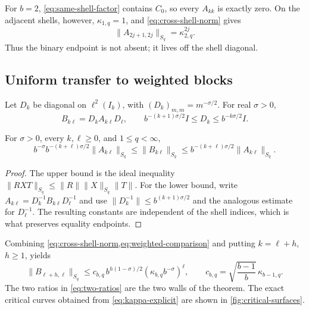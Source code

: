 \begin{remark}
\label{rem:binary-zero-block}
For \(b=2\), \cref{eq:same-shell-factor} contains \(C_0\), so every
\(A_{kk}\) is exactly zero.  On the adjacent shells, however,
\(\kappa_{1,q}=1\), and \cref{eq:cross-shell-norm} gives
\begin{equation}
  \|A_{2j+1,2j}\|_{S_q}=\kappa_{2,q}^{2j}.
  \label{eq:binary-adjacent-exact}
\end{equation}
Thus the binary endpoint is not absent; it lives off the shell diagonal.
\end{remark}

\subsection{Uniform transfer to weighted blocks}

Let \(D_k\) be diagonal on \(\ell^2(I_k)\), with
\((D_k)_{m,m}=m^{-\sigma/2}\).  For real \(\sigma>0\),
\[
  B_{k\ell}=D_kA_{k\ell}D_\ell,
  \qquad
  b^{-(k+1)\sigma/2}I
  \le D_k\le
  b^{-k\sigma/2}I.
\]

\begin{lemma}
\label{lem:weighted-comparison}
For \(\sigma>0\), every \(k,\ell\ge0\), and \(1\le q<\infty\),
\begin{equation}
  b^{-\sigma}b^{-(k+\ell)\sigma/2}
  \|A_{k\ell}\|_{S_q}
  \le
  \|B_{k\ell}\|_{S_q}
  \le
  b^{-(k+\ell)\sigma/2}
  \|A_{k\ell}\|_{S_q}.
  \label{eq:weighted-comparison}
\end{equation}
\end{lemma}

\begin{proof}
The upper bound is the ideal inequality
\(\|RXT\|_{S_q}\le\|R\|\|X\|_{S_q}\|T\|\).  For the lower bound, write
\(A_{k\ell}=D_k^{-1}B_{k\ell}D_\ell^{-1}\) and use
\(\|D_k^{-1}\|\le b^{(k+1)\sigma/2}\) and the analogous estimate for
\(D_\ell^{-1}\).  The resulting constants are independent of the shell
indices, which is what preserves equality endpoints.
\end{proof}

Combining \cref{eq:cross-shell-norm,eq:weighted-comparison} and putting
\(k=\ell+h\), \(h\ge1\), yields
\begin{equation}
  \|B_{\ell+h,\ell}\|_{S_q}
  \le
  c_{b,q}\,
  b^{h(1-\sigma)/2}
  (\kappa_{b,q}b^{-\sigma})^\ell,
  \qquad
  c_{b,q}=\sqrt{\frac{b-1}{b}}\,\kappa_{b-1,q}.
  \label{eq:two-ratios}
\end{equation}
The two ratios in \cref{eq:two-ratios} are the two walls of the theorem.
The exact critical curves obtained from \cref{eq:kappa-explicit} are shown
in \cref{fig:critical-surfaces}.

